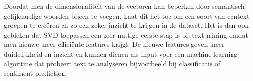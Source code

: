 Doordat men de dimensionaliteit van de vectoren kan beperken door semantisch gelijkaardige woorden bijeen te voegen. Laat dit het toe om een soort van context groepen te cre\"eren en zo een zeker inzicht te krijgen in de dataset. Het is dan ook gebleken dat SVD toepassen een zeer nuttige eerste stap is bij text mining \cite{maas2011learning} omdat men nieuwe meer effici\"ente features krijgt. De nieuwe features geven meer duidelijkheid en inzicht en kunnen dienen als input voor een machine learning algoritme dat probeert text te analyseren bijvoorbeeld bij classificatie of sentiment prediction.

